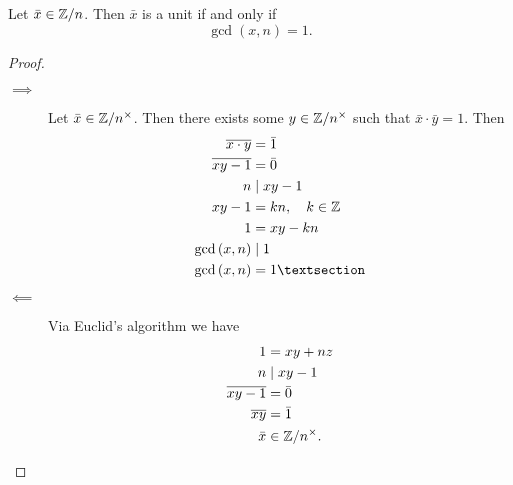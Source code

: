\begin{proposition}
    Let $\bar x \in \mathbb{Z}/n$. Then $\bar x$ is a unit if and only if 
    \[ \gcd{(x, n)} = 1. \]
\end{proposition}

\begin{proof}
    \begin{description}
        \item[$\implies$] Let $\bar x \in \mathbb{Z}/n^\times$. Then there exists some $y \in \mathbb{Z}/n^\times$ such that $\bar x \cdot \bar y = 1$. Then
            \begin{align*}
                \overline{x \cdot y} &= \bar 1 \\
                \overline{xy - 1} &= \bar 0 \\
                n &\mid xy - 1 \\
                xy - 1 &= kn, \quad k \in \Z \\
                1 &= xy - kn \\
                \gcd{(x, n)} &\mid 1 \\
                \gcd{(x, n)} &= 1§
            \end{align*}

        \item[$\impliedby$] Via Euclid's algorithm we have
            \begin{align*}
                1 &= xy + nz \\
                n &\mid xy - 1 \\
                \overline{xy - 1} &= \bar 0 \\
                \overline{xy} &= \bar 1 \\
                \bar x &\in \mathbb{Z}/n^\times.
            \end{align*}
    \end{description}
\end{proof}
